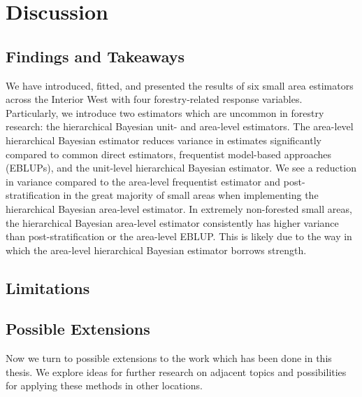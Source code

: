 \documentclass[12pt,twoside]{reedthesis}
\begin{document}
\hypertarget{discussion}{%
\chapter{Discussion}\label{discussion}}

\hypertarget{findings-and-takeaways}{%
\section{Findings and Takeaways}\label{findings-and-takeaways}}

We have introduced, fitted, and presented the results of six small area estimators across the Interior West with four forestry-related response variables. Particularly, we introduce two estimators which are uncommon in forestry research: the hierarchical Bayesian unit- and area-level estimators. The area-level hierarchical Bayesian estimator reduces variance in estimates significantly compared to common direct estimators, frequentist model-based approaches (EBLUPs), and the unit-level hierarchical Bayesian estimator. We see a reduction in variance compared to the area-level frequentist estimator and post-stratification in the great majority of small areas when implementing the hierarchical Bayesian area-level estimator. In extremely non-forested small areas, the hierarchical Bayesian area-level estimator consistently has higher variance than post-stratification or the area-level EBLUP. This is likely due to the way in which the area-level hierarchical Bayesian estimator borrows strength.

\hypertarget{limitations}{%
\section{Limitations}\label{limitations}}

\hypertarget{possible-extensions}{%
\section{Possible Extensions}\label{possible-extensions}}

Now we turn to possible extensions to the work which has been done in this thesis. We explore ideas for further research on adjacent topics and possibilities for applying these methods in other locations.
\end{document}
